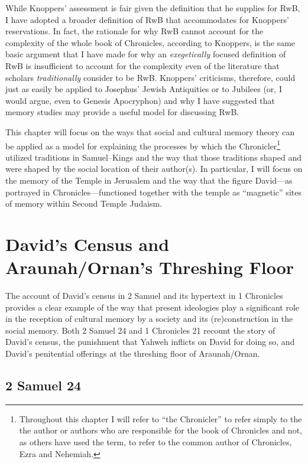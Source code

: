 While Knoppers' assessment is fair given the definition that he supplies
for RwB, I have adopted a broader definition of RwB that accommodates
for Knoppers' reservations. In fact, the rationale for why RwB cannot
account for the complexity of the whole book of Chronicles, according to
Knoppers, is the same basic argument that I have made for why an
\emph{exegetically} focused definition of RwB is insufficient to account
for the complexity even of the literature that scholars
\emph{traditionally} consider to be RwB. Knoppers' criticisms,
therefore, could just as easily be applied to Josephus'
Jewish Antiquities or to Jubilees (or, I would argue, even to
Genesis Apocryphon) and why I have suggested that memory studies may
provide a useful model for discussing RwB.

This chapter will focus on the ways that social and cultural memory
theory can be applied as a model for explaining the processes by which
the Chronicler\footnote{Throughout this chapter I will refer to ``the
  Chronicler'' to refer simply to the the author or authors who are
  responsible for the book of Chronicles and not, as others have used
  the term, to refer to the common author of Chronicles, Ezra and
  Nehemiah.} utilized traditions in Samuel--Kings and the way that those
traditions shaped and were shaped by the social location of their
author(s). In particular, I will focus on the memory of the Temple in
Jerusalem and the way that the figure David---as portrayed in
Chronicles---functioned together with the temple as ``magnetic'' sites
of memory within Second Temple Judaism.\autocite[73]{benzvi_st2017}

\section{David's Census and Araunah/Ornan's Threshing
Floor}\label{davids-census-and-araunahornans-threshing-floor}

The account of David's census in 2 Samuel and its hypertext in 1
Chronicles provides a clear example of the way that present ideologies
play a significant role in the reception of cultural memory by a society
and its (re)construction in the social memory. Both 2 Samuel 24 and 1
Chronicles 21 recount the story of David's census, the punishment that
Yahweh inflicts on David for doing so, and David's penitential offerings
at the threshing floor of Araunah/Ornan.

\subsection{2 Samuel 24}\label{samuel-24}

